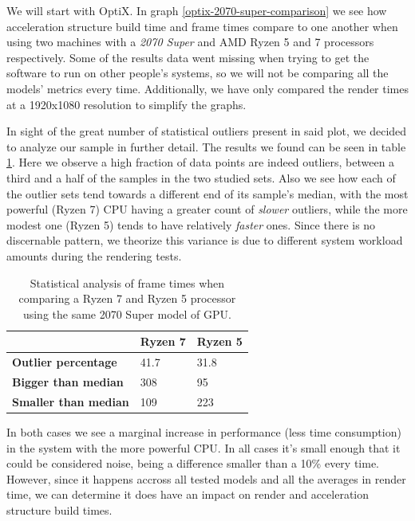 We will start with OptiX. In graph \ref{optix-2070-super-comparison} we see how acceleration structure build time and frame times compare to one another when using two machines with a \textit{2070 Super} and AMD Ryzen 5 and 7 processors respectively. Some of the results data went missing when trying to get the software to run on other people's systems, so we will not be comparing all the models' metrics every time. Additionally, we have only compared the render times at a 1920x1080 resolution to simplify the graphs. 

In sight of the great number of statistical outliers present in said plot, we decided to analyze our sample in further detail. The results we found can be seen in table \ref{frametimes-statistics-table}. Here we observe a high fraction of data points are indeed outliers, between a third and a half of the samples in the two studied sets. Also we see how each of the outlier sets tend towards a different end of its sample's median, with the most powerful (Ryzen 7) CPU having a greater count of \textit{slower} outliers, while the more modest one (Ryzen 5) tends to have relatively \textit{faster} ones. Since there is no discernable pattern, we theorize this variance is due to different system workload amounts during the rendering tests.

\begin{center}
  \begin{table}
    \begin{tabular}{ | m{5cm}| m{1.5cm} | m{1.5cm} |}
  \hline
      & Ryzen 7& Ryzen 5\\
  \hline
  \textbf{Outlier percentage}& 41.7& 31.8\\
  \hline
  \textbf{Bigger than median}& 308& 95\\
  \hline
  \textbf{Smaller than median}& 109& 223\\
  \hline
\end{tabular}
  \label{frametimes-statistics-table}
  \caption{Statistical analysis of frame times when comparing a Ryzen 7 and Ryzen 5 processor using the same 2070 Super model of GPU.}
\end{table}
\end{center}
In both cases we see a marginal increase in performance (less time consumption) in the system with the more powerful CPU. In all cases it's small enough that it could be considered noise, being a difference smaller than a 10\% every time. However, since it happens accross all tested models and all the averages in render time, we can determine it does have an impact on render and acceleration structure build times.

